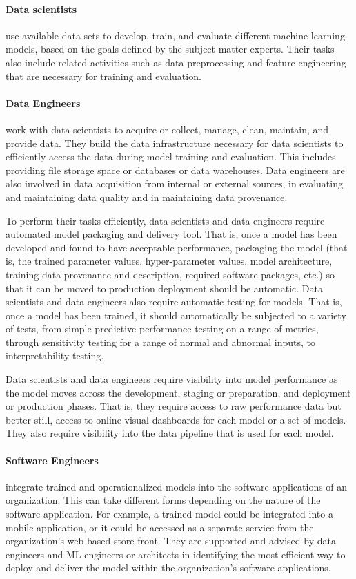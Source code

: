 \paragraph*{Data scientists} use available data sets to develop, train, and evaluate different machine learning models, based on the goals defined by the subject matter experts. Their tasks also include related activities such as data preprocessing and feature engineering that are necessary for training and evaluation. 

\paragraph*{Data Engineers} work with data scientists to acquire or collect, manage, clean, maintain, and provide data. They build the data infrastructure necessary for data scientists to efficiently access the data during model training and evaluation. This includes providing file storage space or databases or data warehouses. Data engineers are also involved in data acquisition from internal or external sources, in evaluating and maintaining data quality and in maintaining data provenance.

To perform their tasks efficiently, data scientists and data engineers require automated model packaging and delivery tool. That is, once a model has been developed and found to have acceptable performance, packaging the model (that is, the trained parameter values, hyper-parameter values, model architecture, training data provenance and description, required software packages, etc.) so that it can be moved to production deployment should be automatic. Data scientists and data engineers also require automatic testing for models. That is, once a model has been trained, it should automatically be subjected to a variety of tests, from simple predictive performance testing on a range of metrics, through sensitivity testing for a range of normal and abnormal inputs, to interpretability testing. 

Data scientists and data engineers require visibility into model performance as the model moves across the development, staging or preparation, and deployment or production phases. That is, they require access to raw performance data but better still, access to online visual dashboards for each model or a set of models. They also require visibility into the data pipeline that is used for each model.

\paragraph*{Software Engineers} integrate trained and operationalized models into the software applications of an organization. This can take different forms depending on the nature of the software application. For example, a trained model could be integrated into a mobile application, or it could be accessed as a separate service from the organization's web-based store front. They are supported and advised by data engineers and ML engineers or architects in identifying the most efficient way to deploy and deliver the model within the organization's software applications. 

